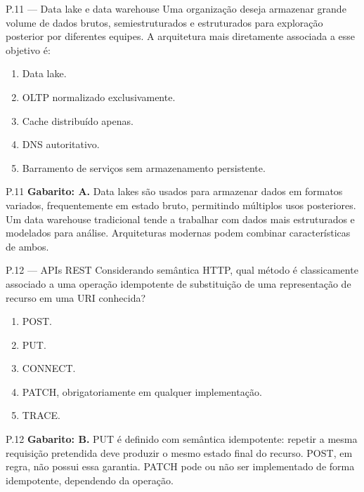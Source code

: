 \begin{questao}{ P.11 — Data lake e data warehouse}
Uma organização deseja armazenar grande volume de dados brutos, semiestruturados e estruturados para exploração posterior por diferentes equipes. A arquitetura mais diretamente associada a esse objetivo é:
\begin{enumerate}[label=\Alph*)]
\item Data lake.
\item OLTP normalizado exclusivamente.
\item Cache distribuído apenas.
\item DNS autoritativo.
\item Barramento de serviços sem armazenamento persistente.
\end{enumerate}
\end{questao}
\begin{solucao}{P.11}
\textbf{Gabarito: A.} Data lakes são usados para armazenar dados em formatos variados, frequentemente em estado bruto, permitindo múltiplos usos posteriores. Um data warehouse tradicional tende a trabalhar com dados mais estruturados e modelados para análise. Arquiteturas modernas podem combinar características de ambos.
\end{solucao}

\begin{questao}{ P.12 — APIs REST}
Considerando semântica HTTP, qual método é classicamente associado a uma operação idempotente de substituição de uma representação de recurso em uma URI conhecida?
\begin{enumerate}[label=\Alph*)]
\item POST.
\item PUT.
\item CONNECT.
\item PATCH, obrigatoriamente em qualquer implementação.
\item TRACE.
\end{enumerate}
\end{questao}
\begin{solucao}{P.12}
\textbf{Gabarito: B.} PUT é definido com semântica idempotente: repetir a mesma requisição pretendida deve produzir o mesmo estado final do recurso. POST, em regra, não possui essa garantia. PATCH pode ou não ser implementado de forma idempotente, dependendo da operação.
\end{solucao}

